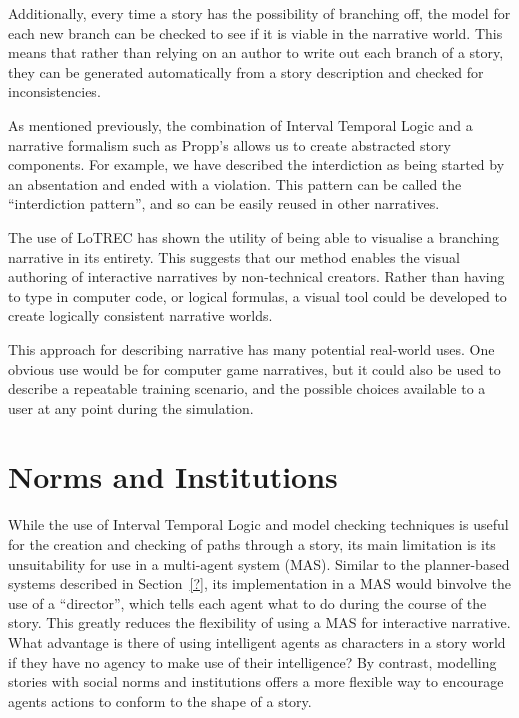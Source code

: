 \documentclass[11pt]{report}
\begin{document}
Additionally, every time a story has the possibility of branching off, the model for each new branch can be checked to see if it is viable in the narrative world. This means that rather than relying on an author to write out each branch of a story, they can be generated automatically from a story description and checked for inconsistencies.

As mentioned previously, the combination of Interval Temporal Logic and a narrative formalism such as Propp's allows us to create abstracted story components. For example, we have described the interdiction as being started by an absentation and ended with a violation. This pattern can be called the ``interdiction pattern'', and so can be easily reused in other narratives.

The use of LoTREC has shown the utility of being able to visualise a branching narrative in its entirety. This suggests that our method enables the visual authoring of interactive narratives by non-technical creators. Rather than having to type in computer code, or logical formulas, a visual tool could be developed to create logically consistent narrative worlds.

This approach for describing narrative has many potential real-world uses. One obvious use would be for computer game narratives, but it could also be used to describe a repeatable training scenario, and the possible choices available to a user at any point during the simulation.

\section{Norms and Institutions}
\label{sec:norms-and-institutions}

While the use of Interval Temporal Logic and model checking techniques is useful
for the creation and checking of paths through a story, its main limitation is
its unsuitability for use in a multi-agent system (MAS). Similar to the
planner-based systems described in Section~\ref{?}, its implementation in a MAS
would binvolve the use of a ``director'', which tells each agent what to do
during the course of the story. This greatly reduces the flexibility of using a
MAS for interactive narrative. What advantage is there of using intelligent
agents as characters in a story world if they have no agency to make use of
their intelligence? By contrast, modelling stories with social norms and
institutions offers a more flexible way to encourage agents actions to conform
to the shape of a story.
\end{document}
